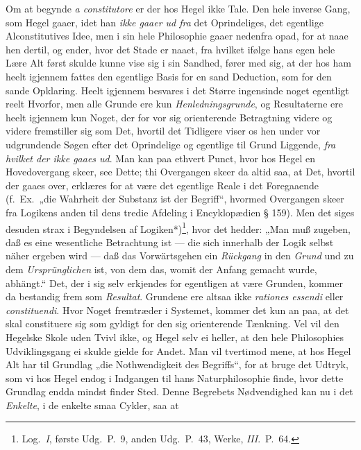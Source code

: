 \documentclass[12pt,a4paper]{book}
\newcommand{\apage}[1]{\marginnote{\footnotesize\textit{[#1]}}}
\begin{document}
Om at begynde \textit{a constitutore} er der hos Hegel ikke Tale. Den
hele inverse Gang, som Hegel gaaer, idet han \emph{ikke gaaer ud fra} det
Oprindeliges, det egentlige Alconstitutives Idee, men i sin hele
Philosophie gaaer nedenfra opad, for at naae hen dertil, og ender,
hvor det Stade er naaet, fra hvilket ifølge hans egen hele Lære Alt
først skulde kunne vise sig i sin Sandhed, fører med sig, at der hos
ham heelt igjennem fattes den egentlige Basis for en sand Deduction,
som for den sande Opklaring. Heelt igjennem besvares i det Større
ingensinde noget egentligt reelt Hvorfor, men alle Grunde ere kun
\emph{Henledningsgrunde}, og Resultaterne ere heelt igjennem kun Noget, der
for vor sig orienterende Betragtning videre og videre fremstiller sig
som Det, hvortil det Tidligere viser os hen under vor udgrundende
Søgen efter det Oprindelige og egentlige til Grund Liggende, \emph{fra
hvilket der ikke gaaes ud}. Man kan paa ethvert Punct, hvor hos Hegel
en Hovedovergang skeer, see Dette; thi Overgangen skeer da altid saa,
at Det, hvortil der gaaes over, erklæres for at være det egentlige
Reale i det Foregaaende (f.\ Ex.\ „die Wahrheit der Substanz ist der
Begriff“, hvormed Overgangen skeer fra Logikens anden til dens tredie
Afdeling i Encyklopædien § 159). Men det siges desuden strax i
Begyndelsen af Logiken*)\footnote{Log.\ \textit{I}, første Udg.\ P.\ 9, anden
Udg.\ P.\ 43, Werke, \textit{III}.\ P.\ 64.}, hvor det hedder: „Man muß zugeben,
daß es eine wesentliche Betrachtung ist --- die sich innerhalb der
Logik selbst näher ergeben wird --- daß das Vorwärtsgehen ein \emph{Rückgang}
in den \emph{Grund} und zu dem \apage{39} \emph{Ursprünglichen} ist, von dem das, womit der
Anfang gemacht wurde, abhängt.“ Det, der i sig selv erkjendes for
egentligen at være Grunden, kommer da bestandig frem som \emph{Resultat}.
Grundene ere altsaa ikke \textit{rationes essendi} eller
\textit{constituendi}. Hvor Noget fremtræder i Systemet, kommer det
kun an paa, at det skal constituere sig som gyldigt for den sig
orienterende Tænkning. Vel vil den Hegelske Skole uden Tvivl ikke, og
Hegel selv ei heller, at den hele Philosophies Udviklingsgang ei
skulde gielde for Andet. Man vil tvertimod mene, at hos Hegel Alt har
til Grundlag „die Nothwendigkeit des Begriffs“, for at bruge det
Udtryk, som vi hos Hegel endog i Indgangen til hans Naturphilosophie
finde, hvor dette Grundlag endda mindst finder Sted. Denne Begrebets
Nødvendighed kan nu i det \emph{Enkelte}, i de enkelte smaa Cykler, saa at
\end{document}
